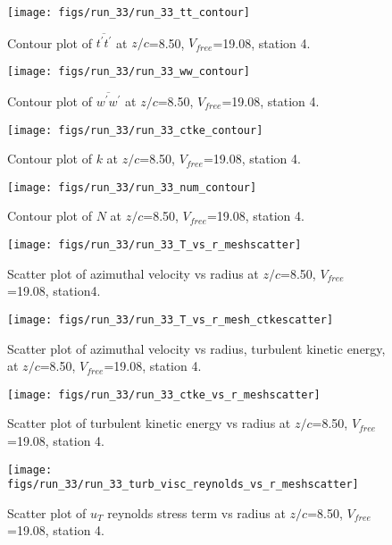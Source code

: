 \begin{figure}[H]
\centering
\texttt{[image: figs/run\_33/run\_33\_tt\_contour]}
\caption{Contour plot of $\overline{t^\prime t^\prime}$ at $z/c$=8.50, $V_{free}$=19.08, station 4.}
\end{figure}


\begin{figure}[H]
\centering
\texttt{[image: figs/run\_33/run\_33\_ww\_contour]}
\caption{Contour plot of $\overline{w^\prime w^\prime}$ at $z/c$=8.50, $V_{free}$=19.08, station 4.}
\end{figure}


\begin{figure}[H]
\centering
\texttt{[image: figs/run\_33/run\_33\_ctke\_contour]}
\caption{Contour plot of $k$ at $z/c$=8.50, $V_{free}$=19.08, station 4.}
\end{figure}


\begin{figure}[H]
\centering
\texttt{[image: figs/run\_33/run\_33\_num\_contour]}
\caption{Contour plot of $N$ at $z/c$=8.50, $V_{free}$=19.08, station 4.}
\end{figure}


\begin{figure}[H]
\centering
\texttt{[image: figs/run\_33/run\_33\_T\_vs\_r\_meshscatter]}
\caption{Scatter plot of azimuthal velocity vs radius at $z/c$=8.50, $V_{free}$=19.08, station4.}
\end{figure}


\begin{figure}[H]
\centering
\texttt{[image: figs/run\_33/run\_33\_T\_vs\_r\_mesh\_ctkescatter]}
\caption{Scatter plot of azimuthal velocity vs radius, turbulent kinetic energy, at $z/c$=8.50, $V_{free}$=19.08, station 4.}
\end{figure}


\begin{figure}[H]
\centering
\texttt{[image: figs/run\_33/run\_33\_ctke\_vs\_r\_meshscatter]}
\caption{Scatter plot of turbulent kinetic energy vs radius at $z/c$=8.50, $V_{free}$=19.08, station 4.}
\end{figure}


\begin{figure}[H]
\centering
\texttt{[image: figs/run\_33/run\_33\_turb\_visc\_reynolds\_vs\_r\_meshscatter]}
\caption{Scatter plot of $
u_T$ reynolds stress term vs radius at $z/c$=8.50, $V_{free}$=19.08, station 4.}
\end{figure}


